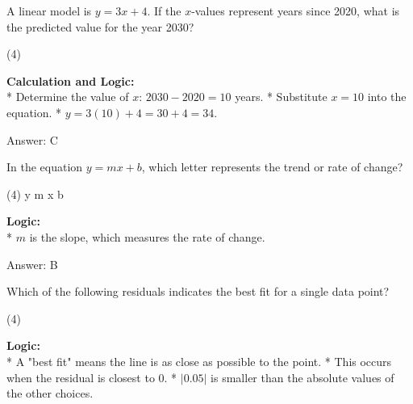 \documentclass[11pt,paper=a4,answers]{exam}
\begin{document}
\begin{questions}
\vspace{60pt}

\question
A linear model is $y = 3x + 4$. If the $x$-values represent years since 2020, what is the predicted value for the year 2030?
\begin{tasks}(4)
\end{tasks}

\begin{solution}
\textbf{Calculation and Logic:} \\
* Determine the value of $x$: $2030 - 2020 = 10$ years.
* Substitute $x = 10$ into the equation.
* $y = 3(10) + 4 = 30 + 4 = 34$.

\vspace{30pt}

Answer: \colorbox{yellow!100}{C}
\end{solution}

\vspace{60pt}

\question
In the equation $y = mx + b$, which letter represents the trend or rate of change?
\begin{tasks}(4)
    \task y
    \task m
    \task x
    \task b
\end{tasks}

\begin{solution}
\textbf{Logic:} \\
* $m$ is the slope, which measures the rate of change.

\vspace{30pt}

Answer: \colorbox{yellow!100}{B}
\end{solution}

\vspace{60pt}

\question
Which of the following residuals indicates the best fit for a single data point?
\begin{tasks}(4)
\end{tasks}

\begin{solution}
\textbf{Logic:} \\
* A "best fit" means the line is as close as possible to the point.
* This occurs when the residual is closest to 0.
* $|0.05|$ is smaller than the absolute values of the other choices.


\end{solution}
\end{questions}
\end{document}
